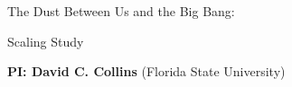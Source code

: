 \documentclass[11pt]{NSF}  %
\begin{document}

\begin{centering}
\begin{LARGE}
The Dust Between Us and the Big Bang:

Scaling Study

\end{LARGE}


\vspace{2mm}
{\bf PI: David C. Collins} (Florida State University)

\end{centering}
\pagestyle{plain}





%



\end{document}
